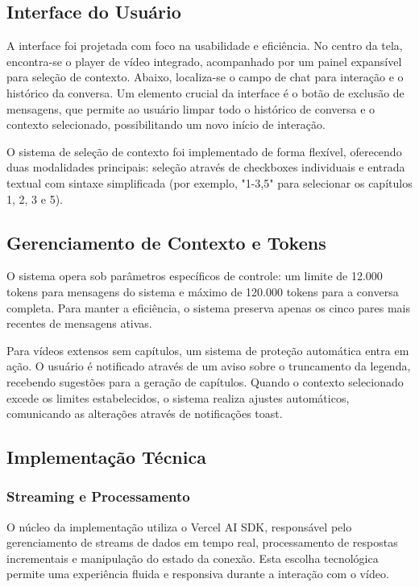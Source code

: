 \documentclass[tcc,capa]{texufpel}
\begin{document}
\subsection{Interface do Usuário}
A interface foi projetada com foco na usabilidade e eficiência. No centro da tela, encontra-se o player de vídeo integrado, acompanhado por um painel expansível para seleção de contexto. Abaixo, localiza-se o campo de chat para interação e o histórico da conversa. Um elemento crucial da interface é o botão de exclusão de mensagens, que permite ao usuário limpar todo o histórico de conversa e o contexto selecionado, possibilitando um novo início de interação.

O sistema de seleção de contexto foi implementado de forma flexível, oferecendo duas modalidades principais: seleção através de checkboxes individuais e entrada textual com sintaxe simplificada (por exemplo, "1-3,5" para selecionar os capítulos 1, 2, 3 e 5).

\subsection{Gerenciamento de Contexto e Tokens}
O sistema opera sob parâmetros específicos de controle: um limite de 12.000 tokens para mensagens do sistema e máximo de 120.000 tokens para a conversa completa. Para manter a eficiência, o sistema preserva apenas os cinco pares mais recentes de mensagens ativas.

Para vídeos extensos sem capítulos, um sistema de proteção automática entra em ação. O usuário é notificado através de um aviso sobre o truncamento da legenda, recebendo sugestões para a geração de capítulos. Quando o contexto selecionado excede os limites estabelecidos, o sistema realiza ajustes automáticos, comunicando as alterações através de notificações toast.

\subsection{Implementação Técnica}
\subsubsection{Streaming e Processamento}
O núcleo da implementação utiliza o Vercel AI SDK, responsável pelo gerenciamento de streams de dados em tempo real, processamento de respostas incrementais e manipulação do estado da conexão. Esta escolha tecnológica permite uma experiência fluida e responsiva durante a interação com o vídeo.
\end{document}
